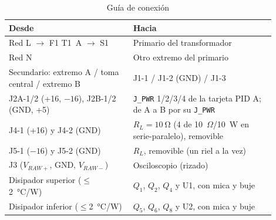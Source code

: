\begin{table}[htbp]
\caption{Guía de conexión}
\label{tab:conex}
\centering
\footnotesize
\begin{tabular}{@{}p{0.42\linewidth}p{0.48\linewidth}@{}}
\toprule
Desde & Hacia \\
\midrule
Red L $\rightarrow$ F1 T1~A $\rightarrow$ S1 & Primario del transformador \\
Red N & Otro extremo del primario \\
Secundario: extremo A / toma central / extremo B & J1-1 / J1-2 (GND) / J1-3 \\
J2A-1/2 (+16, $-16$), J2B-1/2 (GND, +5) & \texttt{J\_PWR} 1/2/3/4 de la tarjeta PID A; de A a B por su \texttt{J\_PWR} \\
J4-1 (+16) y J4-2 (GND) & $R_L=\SI{10}{\ohm}$ (4 de 10~$\Omega$/10~W en serie-paralelo), removible \\
J5-1 ($-16$) y J5-2 (GND) & $R_L$, removible (un riel a la vez) \\
J3 ($V_{RAW+}$, GND, $V_{RAW-}$) & Osciloscopio (rizado) \\
Disipador superior ($\leq$2~°C/W) & $Q_1$, $Q_2$, $Q_4$ y U1, con mica y buje \\
Disipador inferior ($\leq$2~°C/W) & $Q_5$, $Q_6$, $Q_8$ y U2, con mica y buje \\
\bottomrule
\end{tabular}
\end{table}
